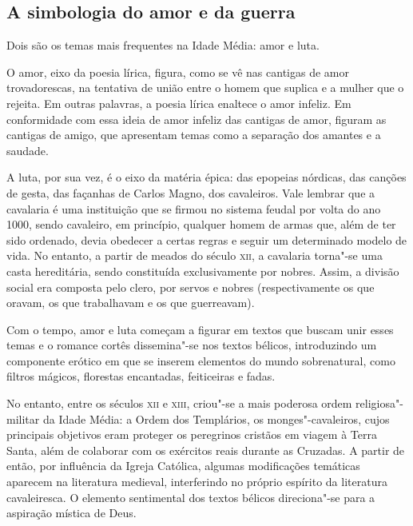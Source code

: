 \documentclass[11pt]{extarticle}
\begin{document}
\subsection{A simbologia do amor e da guerra}

Dois são os temas mais frequentes na Idade Média: amor e luta.

O amor, eixo da poesia lírica, figura, como se vê nas cantigas
de amor trovadorescas, na tentativa de união entre o homem que suplica e
a mulher que o rejeita. Em outras palavras, a poesia lírica enaltece o
amor infeliz. Em conformidade com essa ideia de amor infeliz das
cantigas de amor, figuram as cantigas de amigo, que apresentam temas
como a separação dos amantes e a
saudade.

A luta, por sua vez, é o eixo da matéria épica: das epopeias
nórdicas, das canções de gesta, das façanhas de Carlos Magno, dos
cavaleiros. Vale lembrar que a cavalaria é uma instituição que se firmou
no sistema feudal por volta do ano 1000, sendo cavaleiro, em princípio,
qualquer homem de armas que, além de ter sido ordenado, devia obedecer a
certas regras e seguir um determinado modelo de vida. No entanto, a
partir de meados do século \textsc{xii}, a cavalaria torna"-se uma casta
hereditária, sendo constituída exclusivamente por nobres. Assim, a
divisão social era composta pelo clero, por servos e nobres
(respectivamente os que oravam, os que trabalhavam e os que
guerreavam).

Com o tempo, amor e luta começam a figurar em textos que buscam
unir esses temas e o romance cortês dissemina"-se nos textos bélicos,
introduzindo um componente erótico em que se inserem elementos do mundo
sobrenatural, como filtros mágicos, florestas encantadas, feiticeiras e
fadas.

No entanto, entre os séculos \textsc{xii} e \textsc{xiii}, criou"-se a mais
poderosa ordem religiosa"-militar da Idade Média: a Ordem dos Templários,
os monges"-cavaleiros, cujos principais objetivos eram proteger os
peregrinos cristãos em viagem à Terra Santa, além de colaborar com os
exércitos reais durante as Cruzadas. A partir de então, por influência
da Igreja Católica, algumas modificações temáticas aparecem na
literatura medieval, interferindo no próprio espírito da literatura
cavaleiresca. O elemento sentimental dos textos bélicos direciona"-se
para a aspiração mística de Deus.


\end{document}
